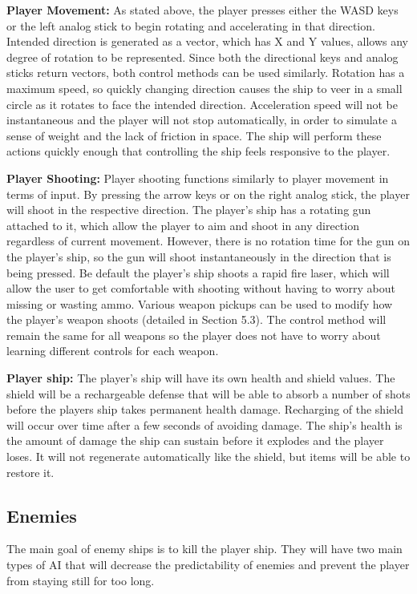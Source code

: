 \documentclass[12pt]{article}       %
\def\hs{\hspace{15pt}}
\begin{document}
	{\bf Player Movement:}	As stated above, the player presses either the WASD keys or the left analog stick to begin rotating and accelerating in that direction. Intended direction is generated as a vector, which has X and Y values, allows any degree of rotation to be represented. Since both the directional keys and analog sticks return vectors, both control methods can be used similarly. Rotation has a maximum speed, so quickly changing direction causes the ship to veer in a small circle as it rotates to face the intended direction. Acceleration speed will not be instantaneous and the player will not stop automatically, in order to simulate a sense of weight and the lack of friction in space. The ship will perform these actions quickly enough that controlling the ship feels responsive to the player. 

	{\bf Player Shooting:} Player shooting functions similarly to player movement in terms of input. By pressing the arrow keys or on the right analog stick, the player will shoot in the respective direction. The player's ship has a rotating gun attached to it, which allow the player to aim and shoot in any direction regardless of current movement. However, there is no rotation time for the gun on the player's ship, so the gun will shoot instantaneously in the direction that is being pressed. Be default the player's ship shoots a rapid fire laser, which will allow the user to get comfortable with shooting without having to worry about missing or wasting ammo. Various weapon pickups can be used to modify how the player's weapon shoots (detailed in Section 5.3). The control method will remain the same for all weapons so the player does not have to worry about learning different controls for each weapon.

	{\bf Player ship:} The player's ship will have its own health and shield values. The shield will be a rechargeable defense that will be able to absorb a number of shots before the players ship takes permanent health damage. Recharging of the shield will occur over time after a few seconds of avoiding damage. The ship's health is the amount of damage the ship can sustain before it explodes and the player loses. It will not regenerate automatically like the shield, but items will be able to restore it.

\subsection{Enemies} %

	\hs {\bf Enemies: } The main goal of enemy ships is to kill the player ship. They will have two main types of AI that will decrease the predictability of enemies and prevent the player from staying still for too long. \\
\end{document}
